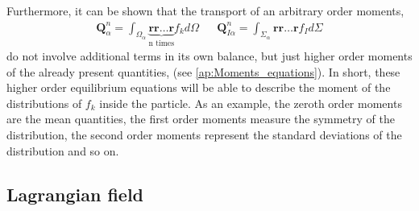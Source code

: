 Furthermore, it can be shown that the transport of an arbitrary order moments,
\begin{align*}
    \textbf{Q}_\alpha^n
    = \int_{\Omega_\alpha} \underbrace{
        \textbf{r}\textbf{r}\ldots\textbf{r}
    }_{
        \text{n times}
    }
    f_k d\Omega
    & &
    \textbf{Q}_{I\alpha}^n
    = \int_{\Sigma_\alpha}
        \textbf{r}\textbf{r}\ldots\textbf{r}
    f_I d\Sigma
\end{align*} 
do not involve additional terms in its own balance, but just higher order moments of the already present quantities, (see \ref{ap:Moments_equations}).
In short, these higher order equilibrium equations will be able to describe the moment of the distributions of $f_k$ inside the particle.
As an example, the zeroth order moments are the mean quantities, the first order moments measure the symmetry of the distribution, the second order moments represent the standard deviations of the distribution and so on.




\subsection{Lagrangian field}

